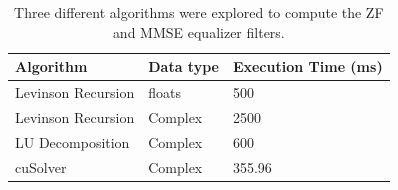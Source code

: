\begin{table}
\caption{Three different algorithms were explored to compute the ZF and MMSE equalizer filters.}
\begin{center}
\begin{tabular}{lll}
	\toprule
	Algorithm 			& Data type	& Execution Time (ms)	\\ \midrule
	Levinson Recursion 	& floats 	& 500 					\\
	Levinson Recursion 	& Complex 	& 2500 					\\
	LU Decomposition 	& Complex 	& 600				 	\\
	cuSolver			& Complex	& 355.96				\\
	\bottomrule
\end{tabular}
\end{center}
\label{tab:ZFMMSEtimingComparison}
\end{table}

